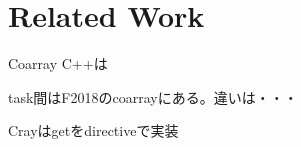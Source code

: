 \section{Related Work}\label{sec:related}


Coarray C++は

task間はF2018のcoarrayにある。違いは・・・

Crayはgetをdirectiveで実装



